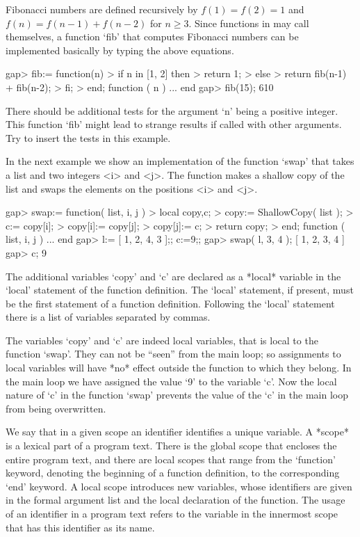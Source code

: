 Fibonacci numbers are defined recursively by $f(1) = f(2) =  1$ and
$f(n) =  f(n-1) + f(n-2)$ for $n \geq 3$.
Since functions in {\GAP} may call themselves,
a function `fib' that computes Fibonacci numbers can be implemented
basically by typing the above equations.

\beginexample
    gap> fib:= function(n)
    >       if n in [1, 2] then
    >          return 1;
    >       else
    >          return fib(n-1) + fib(n-2);
    >       fi;
    >    end;
    function ( n ) ... end
    gap> fib(15);
    610
\endexample

There should be additional tests for the  argument  `n' being  a positive
integer.   This  function `fib' might  lead to strange  results if called
with other arguments.  Try to insert the tests in this example.


In the next example we show an implementation of the function `swap'
that takes a list and two integers <i> and <j>. The function makes
a shallow copy of the list and swaps the elements on the positions
<i> and <j>.

\beginexample
    gap> swap:= function( list, i, j )
    >      local copy,c;
    >      copy:= ShallowCopy( list );
    >      c:= copy[i];
    >      copy[i]:= copy[j];
    >      copy[j]:= c;
    >      return copy;
    >      end;
    function ( list, i, j ) ... end
    gap> l:= [ 1, 2, 4, 3 ];; c:=9;;
    gap> swap( l, 3, 4 );
    [ 1, 2, 3, 4 ]
    gap> c;
    9
\endexample
 

The additional  variables `copy'  and `c' are declared as  a  *local*  
variable in the `local' statement  of the function definition.  The `local' 
statement, if present, must  be the first  statement of  a function  
definition. Following the `local' statement there is a list of variables
separated by commas.

The  variables `copy'  and `c' are indeed local variables, that is local to 
the function `swap'. They can not be ``seen'' from the main loop; so 
assignments to local variables will have *no* effect outside the function
to which they belong. In the main loop we have assigned the value `9' to the
variable `c'. Now the local nature of `c' in the function `swap' prevents  
the value of the `c' in the main loop from being overwritten.

We say  that in a given scope an identifier identifies a unique variable.
A *scope* is a lexical part of a program text.  There is the global scope
that encloses  the  entire program text, and there are local  scopes that
range from the `function'  keyword, denoting the beginning of  a function
definition, to the corresponding `end' keyword.  A local scope introduces
new  variables, whose identifiers are  given in the formal argument  list
and the local declaration of the function.  The usage of an identifier in
a program text refers to  the  variable in  the  innermost scope that has
this identifier as its name.

